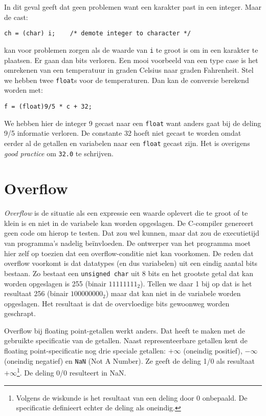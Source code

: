 In dit geval geeft dat geen problemen want een karakter past in een integer. Maar de cast:

\hspace*{1em}\texttt{ch = (char) i; \ \ \  /* demote integer to character */}

kan voor problemen zorgen als de waarde van \texttt{i} te groot is om in een karakter te plaatsen. Er gaan dan bits verloren. Een mooi voorbeeld van een type case is het omrekenen van een temperatuur in graden Celsius naar graden Fahrenheit. Stel we hebben twee \texttt{float}s voor de temperaturen. Dan kan de conversie berekend worden met:

\hspace*{1em}\texttt{f = (float)9/5 * c + 32;}

We hebben hier de integer 9 gecast naar een \texttt{float} want anders gaat bij de deling 9/5 informatie verloren. De constante 32 hoeft niet gecast te worden omdat eerder al de getallen en variabelen naar een \texttt{float} gecast zijn. Het is overigens \textsl{good practice} om \texttt{32.0} te schrijven.
 

\section{Overflow}
\textsl{Overflow} is de situatie als een expressie een waarde oplevert die te groot of te klein is en niet in de variabele kan worden opgeslagen. De C-compiler genereert geen code om hierop te testen. Dat zou wel kunnen, maar dat zou de executietijd van programma's nadelig beïnvloeden. De ontwerper van het programma moet hier zelf op toezien dat een overflow-conditie niet kan voorkomen. De reden dat overflow voorkomt is dat datatypes (en dus variabelen) uit een eindig aantal bits bestaan. Zo bestaat een \texttt{unsigned char} uit 8 bits en het grootste getal dat kan worden opgeslagen is 255 (binair $11111111_2$). Tellen we daar 1 bij op dat is het resultaat 256 (binair $100000000_2$) maar dat kan niet in de variabele worden opgeslagen. Het resultaat is dat de overvloedige bits gewoonweg worden geschrapt.

Overflow bij floating point-getallen werkt anders. Dat heeft te maken met de gebruikte specificatie van de getallen.
Naast representeerbare getallen kent de floating point-specificatie nog drie speciale getallen: $+\infty$ (oneindig positief), $-\infty$ (oneindig negatief) en \texttt{NaN} (Not A Number). Ze geeft de deling 1/0 als resultaat $+\infty$\footnote{Volgens de wiskunde is het resultaat van een deling door 0 onbepaald. De specificatie definieert echter de deling als oneindig.}. De deling 0/0 resulteert in NaN.


